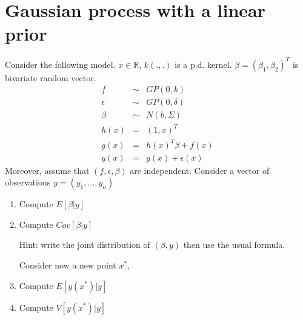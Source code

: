 \documentclass{article}[12pt]
\begin{document}
\section{Gaussian process with a linear prior}
Consider the following model. $x \in \mathbb{R}$, $k(.,.)$ is a p.d. kernel. $\beta=(\beta_1,\beta_2)^T$ is bivariate random vector.   
\begin{eqnarray}
f & \sim & GP(0,k)\\
\epsilon & \sim & GP(0,\delta) \\
\beta & \sim & N(b,\Sigma) \\
h(x) & = & (1,x)^T\\
g(x) & = & h(x)^T \beta + f(x)\\
y(x) &=& g(x) + \epsilon(x) 
\end{eqnarray}
Moreover, assume that $(f,\epsilon,\beta)$ are independent. Consider a vector of observations $y=(y_1,\ldots,y_n)$ 
\begin{enumerate}
\item Compute $E[\beta|y]$
\item Compute $Cov[\beta|y]$

Hint: write the joint distribution of $(\beta,y)$ then use the usual formula.

Consider now a new point $x^*$,
\item Compute $E[y(x^*)|y]$
\item Compute $V[y(x^*)|y]$

\end{enumerate}
\end{document}
